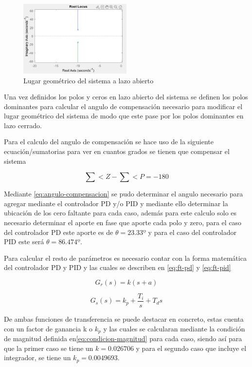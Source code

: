 \documentclass[conference]{IEEEtran}
\begin{document}
	\begin{figure}[h]
		\centering
		\includegraphics[width=0.5\textwidth]{media/lgr-planta.png}
		\caption{Lugar geométrico del sistema a lazo abierto}
		\label{fig:lgr-planta}
	\end{figure}
	
	Una vez definidos los polos y ceros en lazo abierto del sistema se definen los polos dominantes para calcular el angulo de compensación necesario para modificar el lugar geométrico del sistema de modo que este pase por los polos dominantes en lazo cerrado.
	
	Para el calculo del angulo de compensación se hace uso de la siguiente ecuación/sumatorias para ver en cuantos grados se tienen que compensar el sistema
	
	\begin{equation}
		\sum<Z -\sum<P = -180
		\label{eq:angulo-compensacion}
	\end{equation}
	
	Mediante \ref{eq:angulo-compensacion} se pudo determinar el angulo necesario para agregar mediante el controlador PD y/o PID y mediante ello determinar la ubicación de los cero faltante para cada caso, además para este calculo solo es necesario determinar el aporte en fase que aporte cada polo y zero, para el caso del controlador PD este aporte es de $\theta = 23.33º$ y para el caso del controlador PID este será $\theta = 86.474º$.
	
	Para calcular el resto de parámetros es necesario contar con la forma matemática del controlador PD y PID y las cuales se describen en \ref{eq:ft-pd} y \ref{eq:ft-pid}
	
	\begin{equation}
		G_r(s) = k(s + a)
		\label{eq:ft-pd}
	\end{equation}
	
	\begin{equation}
		G_s(s) = k_p + \frac{T_i}{s} + T_ds
		\label{eq:ft-pid}
	\end{equation}
	
	De ambas funciones de transferencia se puede destacar en concreto, estas cuenta con un factor de ganancia k o $k_p$ y las cuales se calcularan mediante la condición de magnitud definida en\ref{eq:condicion-magnitud} para cada caso, siendo así para que la primer caso se tiene un $k = 0.026706$ y para el segundo caso que incluye el integrador, se tiene un $k_p = 0.0049693$.
	
\end{document}

